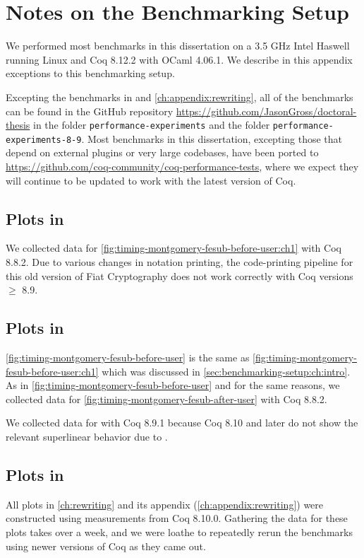 \chapter{Notes on the Benchmarking Setup}\label{ch:appendix:benchmarking-setup}

We performed most benchmarks in this dissertation on a 3.5 GHz Intel Haswell running Linux and Coq 8.12.2 with OCaml 4.06.1.
We describe in this appendix exceptions to this benchmarking setup.

Excepting the benchmarks in  and \autoref{ch:appendix:rewriting}, all of the benchmarks can be found in the GitHub repository \url{https://github.com/JasonGross/doctoral-thesis} in the folder \texttt{performance-experiments} and the folder \texttt{performance-experiments-8-9}.
Most benchmarks in this dissertation, excepting those that depend on external plugins or very large codebases, have been ported to \url{https://github.com/coq-community/coq-performance-tests}, where we expect they will continue to be updated to work with the latest version of Coq.

\section{Plots in }\label{sec:benchmarking-setup:ch:intro}
We collected data for \autoref{fig:timing-montgomery-fesub-before-user:ch1} with Coq 8.8.2.
Due to various changes in notation printing, the code-printing pipeline for this old version of Fiat Cryptography does not work correctly with Coq versions $\ge$ 8.9.

\section{Plots in }
\autoref{fig:timing-montgomery-fesub-before-user} is the same as \autoref{fig:timing-montgomery-fesub-before-user:ch1} which was discussed in \autoref{sec:benchmarking-setup:ch:intro}.
As in \autoref{fig:timing-montgomery-fesub-before-user} and for the same reasons, we collected data for \autoref{fig:timing-montgomery-fesub-after-user} with Coq 8.8.2.

We collected data for  with Coq 8.9.1 because Coq 8.10 and later do not show the relevant superlinear behavior due to .

\section{Plots in }
All plots in \autoref{ch:rewriting} and its appendix (\autoref{ch:appendix:rewriting}) were constructed using measurements from Coq 8.10.0.
Gathering the data for these plots takes over a week, and we were loathe to repeatedly rerun the benchmarks using newer versions of Coq as they came out.
